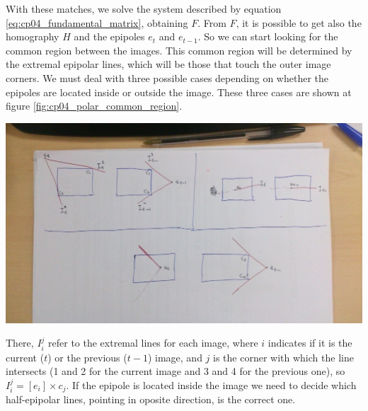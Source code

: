 \begin{framed}
With these matches, we solve the system described by equation \ref{eq:cp04_fundamental_matrix}, obtaining $F$. From $F$, it is possible to get also the homography $H$ and the epipoles $e_t$ and $e_{t-1}$. So we can start looking for the common region between the images. This common region will be determined by the extremal epipolar lines, which will be those that touch the outer image corners. We must deal with three possible cases depending on
whether the epipoles are located inside or outside the image. These three cases are shown at figure \ref{fig:cp04_polar_common_region}.

\begin{center}
\includegraphics{polar_common_region}
\label{fig:cp04_polar_common_region}
\end{center}

There, $I_i^j$ refer to the extremal lines for each image, where $i$ indicates if it is the current ($t$) or the previous ($t - 1$) image, and $j$ is the corner with which the line intersects (1 and 2 for the current image and 3 and 4 for the previous one), so $I_i^j = [e_i] \times c_j$. If the epipole is located inside the image we need to decide which half-epipolar lines, pointing in oposite direction, is the correct one. 


\end{framed}
